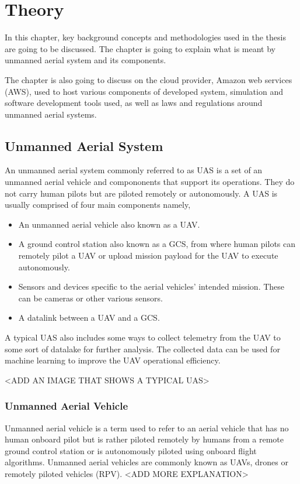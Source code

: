 
\chapter{Theory}

In this chapter, key background concepts and methodologies used in the thesis are going to be discussed. The chapter is going to explain what is meant by unmanned aerial system and its components.

The chapter is also going to discuss on the cloud provider, Amazon web services (AWS), used to host various components of developed system, simulation and software development tools used, as well as laws and regulations around unmanned aerial systems.

\section{Unmanned Aerial System}
\label{sec:unmanned-aerial-system}

An unmanned aerial system commonly referred to as UAS is a set of an unmanned aerial vehicle and compononents that support its operations. They do not carry human pilots but are piloted remotely or autonomously. A UAS is usually comprised of four main components namely,

\begin{itemize}
    \item An unmanned aerial vehicle also known as a UAV.
    \item A ground control station also known as a GCS, from where human pilots can remotely pilot a UAV or upload mission payload for the UAV to execute autonomously.
    \item Sensors and devices specific to the aerial vehicles' intended mission. These can be cameras or other various sensors.
    \item A datalink between a UAV and a GCS.
\end{itemize}

A typical UAS also includes some ways to collect telemetry from the UAV to some sort of datalake for further analysis. The collected data can be used for machine learning to improve the UAV operational efficiency.

<ADD AN IMAGE THAT SHOWS A TYPICAL UAS>

\subsection{Unmanned Aerial Vehicle}
Unmanned aerial vehicle is a term used to refer to an aerial vehicle that has no human onboard pilot but is rather piloted remotely by humans from a remote ground control station or is autonomously piloted using onboard flight algorithms. Unmanned aerial vehicles are commonly known as UAVs, drones or remotely piloted vehicles (RPV).
<ADD MORE EXPLANATION>

